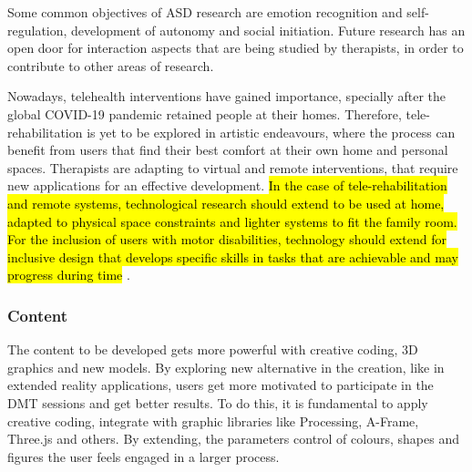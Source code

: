 \documentclass[a4paper,fleqn]{cas-sc}
\begin{document}
Some common objectives of ASD research are emotion recognition and self-regulation, development of autonomy and social initiation. Future research has an open door for interaction aspects that are being studied by therapists, in order to contribute to other areas of research.

Nowadays, telehealth interventions have gained importance, specially after the global COVID-19 pandemic retained people at their homes. Therefore, tele-rehabilitation is yet to be explored in artistic endeavours, where the process can benefit from users that find their best comfort at their own home and personal spaces. Therapists are adapting to virtual and remote interventions, that require new applications for an effective development.  \hl{In the case of tele-rehabilitation and remote systems, technological research should extend to be used at home, adapted to physical space constraints and lighter systems to fit the family room. For the inclusion of users with motor disabilities, technology should extend for inclusive design that develops specific skills in tasks that are achievable and may progress during time} \cite{Vargas20}.


\subsubsection{Content}

The content to be developed gets more powerful with creative coding, 3D graphics and new models. By exploring new alternative in the creation, like in extended reality applications, users get more motivated to participate in the DMT sessions and get better results. To do this, it is fundamental to apply creative coding, integrate with graphic libraries like Processing, A-Frame, Three.js and others. By extending, the parameters control of colours, shapes and figures the user feels engaged in a larger process.
\end{document}
